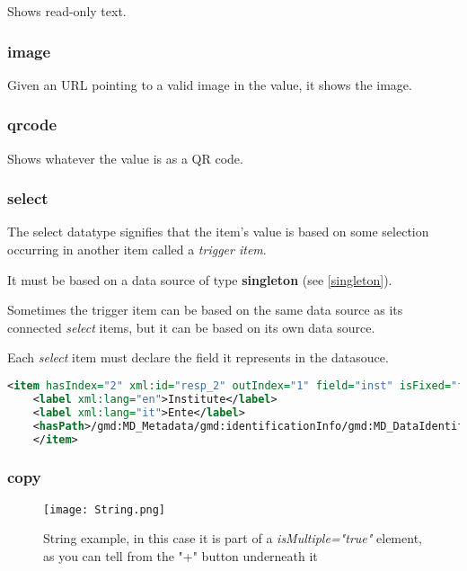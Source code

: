 Shows read-only text.

\subsubsection{image}
\label{image}

Given an URL pointing to a valid image in the value, it shows the image.

\subsubsection{qrcode}
\label{qrcode}

Shows whatever the value is as a QR code.


\subsubsection{select}
\label{select}

The select datatype signifies that the item's value is based on some selection occurring in another item called a \textit{trigger item}.

It must be based on a data source of type \textbf{singleton} (see \ref{singleton}).

Sometimes the trigger item can be based on the same data source as its connected \textit{select} items, but it can be based on its own data source.

Each \textit{select} item must declare the field it represents in the datasouce.

\begin{lstlisting}[language=xml]
	<item hasIndex="2" xml:id="resp_2" outIndex="1" field="inst" isFixed="false" hasDatatype="select" datasource="personS_2">
	<label xml:lang="en">Institute</label>
	<label xml:lang="it">Ente</label>
	<hasPath>/gmd:MD_Metadata/gmd:identificationInfo/gmd:MD_DataIdentification/gmd:citation/gmd:CI_Citation/gmd:citedResponsibleParty/gmd:CI_ResponsibleParty/gmd:organisationName/gco:CharacterString</hasPath>
	</item>
\end{lstlisting}

\subsubsection{copy}
\label{copy}

\begin{figure}[h]
	\caption{String example, in this case it is part of a \textit{isMultiple="true"} element, as you can tell from the "+" button underneath it}
	\texttt{[image: String.png]}
	\centering
\end{figure}


